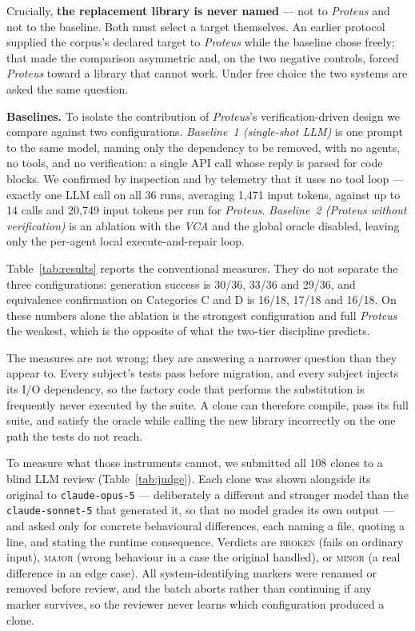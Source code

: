Crucially, \textbf{the replacement library is never named} --- not to
\emph{Proteus} and not to the baseline. Both must select a target themselves.
An earlier protocol supplied the corpus's declared target to \emph{Proteus}
while the baseline chose freely; that made the comparison asymmetric and, on
the two negative controls, forced \emph{Proteus} toward a library that cannot
work. Under free choice the two systems are asked the same question.

\textbf{Baselines.} To isolate the contribution of \emph{Proteus}'s
verification-driven design we compare against two configurations.
\emph{Baseline~1 (single-shot LLM)} is one prompt to the same model, naming
only the dependency to be removed, with no agents, no tools, and no
verification: a single API call whose reply is parsed for code blocks. We
confirmed by inspection and by telemetry that it uses no tool loop --- exactly
one LLM call on all 36 runs, averaging 1{,}471 input tokens, against up to 14
calls and 20{,}749 input tokens per run for \emph{Proteus}. \emph{Baseline~2
(\emph{Proteus} without verification)} is an ablation with the \emph{VCA} and
the global oracle disabled, leaving only the per-agent local execute-and-repair
loop.


Table~\ref{tab:results} reports the conventional measures. They do not separate
the three configurations: generation success is 30/36, 33/36 and 29/36, and
equivalence confirmation on Categories C and D is 16/18, 17/18 and 16/18. On
these numbers alone the ablation is the strongest configuration and full
\emph{Proteus} the weakest, which is the opposite of what the two-tier
discipline predicts.

The measures are not wrong; they are answering a narrower question than they
appear to. Every subject's tests pass before migration, and every subject
injects its I/O dependency, so the factory code that performs the substitution
is frequently never executed by the suite. A clone can therefore compile, pass
its full suite, and satisfy the oracle while calling the new library
incorrectly on the one path the tests do not reach.

To measure what those instruments cannot, we submitted all 108 clones to a
blind LLM review (Table~\ref{tab:judge}). Each clone was shown alongside its
original to \texttt{claude-opus-5} --- deliberately a different and stronger
model than the \texttt{claude-sonnet-5} that generated it, so that no model
grades its own output --- and asked only for concrete behavioural differences,
each naming a file, quoting a line, and stating the runtime consequence.
Verdicts are \textsc{broken} (fails on ordinary input), \textsc{major} (wrong
behaviour in a case the original handled), or \textsc{minor} (a real difference
in an edge case). All system-identifying markers were renamed or removed before
review, and the batch aborts rather than continuing if any marker survives, so
the reviewer never learns which configuration produced a clone.

